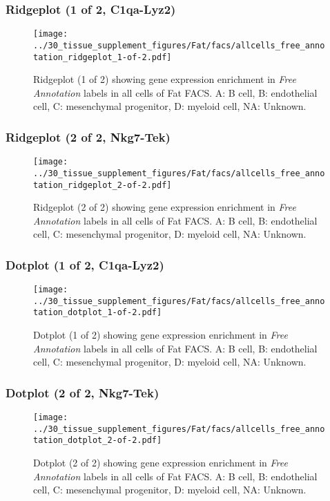\clearpage

\subsubsection{Ridgeplot (1 of 2, C1qa-Lyz2)}
\begin{figure}[h]
\centering
\texttt{[image: ../30\_tissue\_supplement\_figures/Fat/facs/allcells\_free\_annotation\_ridgeplot\_1-of-2.pdf]}

\caption{ Ridgeplot (1 of 2)  showing gene expression enrichment in \emph{Free Annotation} labels in all cells of Fat FACS. A: B cell, B: endothelial cell, C: mesenchymal progenitor, D: myeloid cell, NA: Unknown.}
\end{figure}


\clearpage

\subsubsection{Ridgeplot (2 of 2, Nkg7-Tek)}
\begin{figure}[h]
\centering
\texttt{[image: ../30\_tissue\_supplement\_figures/Fat/facs/allcells\_free\_annotation\_ridgeplot\_2-of-2.pdf]}

\caption{ Ridgeplot (2 of 2)  showing gene expression enrichment in \emph{Free Annotation} labels in all cells of Fat FACS. A: B cell, B: endothelial cell, C: mesenchymal progenitor, D: myeloid cell, NA: Unknown.}
\end{figure}


\clearpage

\subsubsection{Dotplot (1 of 2, C1qa-Lyz2)}
\begin{figure}[h]
\centering
\texttt{[image: ../30\_tissue\_supplement\_figures/Fat/facs/allcells\_free\_annotation\_dotplot\_1-of-2.pdf]}

\caption{ Dotplot (1 of 2)  showing gene expression enrichment in \emph{Free Annotation} labels in all cells of Fat FACS. A: B cell, B: endothelial cell, C: mesenchymal progenitor, D: myeloid cell, NA: Unknown.}
\end{figure}


\clearpage

\subsubsection{Dotplot (2 of 2, Nkg7-Tek)}
\begin{figure}[h]
\centering
\texttt{[image: ../30\_tissue\_supplement\_figures/Fat/facs/allcells\_free\_annotation\_dotplot\_2-of-2.pdf]}

\caption{ Dotplot (2 of 2)  showing gene expression enrichment in \emph{Free Annotation} labels in all cells of Fat FACS. A: B cell, B: endothelial cell, C: mesenchymal progenitor, D: myeloid cell, NA: Unknown.}
\end{figure}


